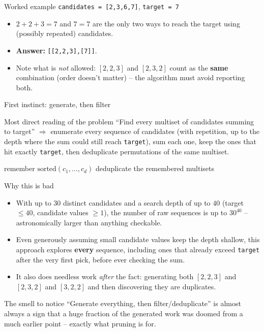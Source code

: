 \documentclass[11pt,aspectratio=169]{beamer}
\begin{document}
\begin{frame}{Worked example}
  \texttt{candidates = [2,3,6,7]}, \texttt{target = 7}
  \begin{itemize}
    \item $2+2+3 = 7$ and $7 = 7$ are the only two ways to reach the target using
    (possibly repeated) candidates.
    \item \textbf{Answer:} \texttt{[[2,2,3],[7]]}.
    \item Note what is \emph{not} allowed: $[2,2,3]$ and $[2,3,2]$ count as the
    \textbf{same} combination (order doesn't matter) -- the algorithm must avoid
    reporting both.
  \end{itemize}
\end{frame}

\begin{frame}{First instinct: generate, then filter}
  \begin{block}{Most direct reading of the problem}
    ``Find every multiset of candidates summing to target'' $\Rightarrow$ enumerate
    every sequence of candidates (with repetition, up to the depth where the sum could
    still reach \texttt{target}), sum each one, keep the ones that hit exactly
    \texttt{target}, then deduplicate permutations of the same multiset.
  \end{block}
  \begin{algorithmic}[1]
       remember $\text{sorted}(c_1,\dots,c_d)$ \EndIf
    \EndFor
    \State deduplicate the remembered multisets
  \end{algorithmic}
\end{frame}

\begin{frame}{Why this is bad}
  \begin{itemize}
    \item With up to $30$ distinct candidates and a search depth of up to $40$ (target
    $\le 40$, candidate values $\ge 1$), the number of raw sequences is up to
    $30^{40}$ -- astronomically larger than anything checkable.
    \item Even generously assuming small candidate values keep the depth shallow, this
    approach explores \textbf{every} sequence, including ones that already exceed
    \texttt{target} after the very first pick, before ever checking the sum.
    \item It also does needless work \emph{after} the fact: generating both
    $[2,2,3]$ and $[2,3,2]$ and $[3,2,2]$ and then discovering they are duplicates.
  \end{itemize}
  \begin{alertblock}{The smell to notice}
    ``Generate everything, then filter/deduplicate'' is almost always a sign that a
    huge fraction of the generated work was doomed from a much earlier point --
    exactly what pruning is for.
  \end{alertblock}
\end{frame}
\end{document}
